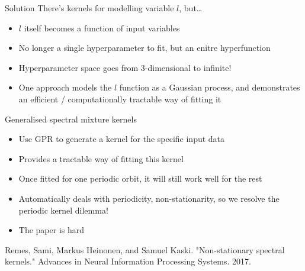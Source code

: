 \documentclass[presentation]{beamer}
\begin{document}
\begin{frame}[label={sec:org1569479}]{Solution}
There's kernels for modelling variable \(l\), but\ldots{}
\begin{itemize}
\item \(l\) itself becomes a function of input variables
\item No longer a single hyperparameter to fit, but an enitre hyperfunction
\item Hyperparameter space goes from 3-dimensional to infinite!
\item One approach models the \(l\) function as a Gaussian process, and demonstrates an efficient / computationally tractable way of fitting it
\end{itemize}
\end{frame}

\begin{frame}[label={sec:org5c0304c}]{Generalised spectral mixture kernels}
\begin{itemize}
\item Use GPR to generate a kernel for the specific input data
\item Provides a tractable way of fitting this kernel
\item Once fitted for one periodic orbit, it will still work well for the rest
\item Automatically deals with periodicity, non-stationarity, so we resolve the periodic kernel dilemma!
\item The paper is hard
\end{itemize}

\vfill

Remes, Sami, Markus Heinonen, and Samuel Kaski. "Non-stationary spectral kernels." Advances in Neural Information Processing Systems. 2017.
\end{frame}
\end{document}
